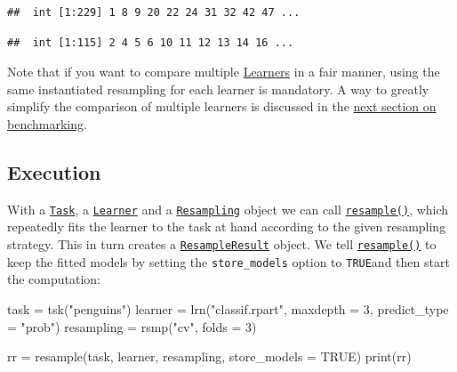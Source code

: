 \documentclass[
]{scrbook}
\newenvironment{Shaded}{\begin{snugshade}}{\end{snugshade}}
\newcommand{\AttributeTok}[1]{\textcolor[rgb]{0.77,0.63,0.00}{#1}}
\newcommand{\ConstantTok}[1]{\textcolor[rgb]{0.00,0.00,0.00}{#1}}
\newcommand{\DecValTok}[1]{\textcolor[rgb]{0.00,0.00,0.81}{#1}}
\newcommand{\FunctionTok}[1]{\textcolor[rgb]{0.00,0.00,0.00}{#1}}
\newcommand{\NormalTok}[1]{#1}
\newcommand{\OtherTok}[1]{\textcolor[rgb]{0.56,0.35,0.01}{#1}}
\newcommand{\SpecialCharTok}[1]{\textcolor[rgb]{0.00,0.00,0.00}{#1}}
\newcommand{\StringTok}[1]{\textcolor[rgb]{0.31,0.60,0.02}{#1}}
\renewenvironment{Shaded} {\begin{snugshade}\small} {\end{snugshade}}
\begin{document}
\begin{verbatim}
##  int [1:229] 1 8 9 20 22 24 31 32 42 47 ...
\end{verbatim}

\begin{Shaded}
\end{Shaded}

\begin{verbatim}
##  int [1:115] 2 4 5 6 10 11 12 13 14 16 ...
\end{verbatim}

Note that if you want to compare multiple \protect\hyperlink{learners}{Learners} in a fair manner, using the same instantiated resampling for each learner is mandatory.
A way to greatly simplify the comparison of multiple learners is discussed in the \protect\hyperlink{benchmarking}{next section on benchmarking}.

\hypertarget{resampling-exec}{%
\subsection{Execution}\label{resampling-exec}}

With a \href{https://mlr3.mlr-org.com/reference/Task.html}{\texttt{Task}}, a \href{https://mlr3.mlr-org.com/reference/Learner.html}{\texttt{Learner}} and a \href{https://mlr3.mlr-org.com/reference/Resampling.html}{\texttt{Resampling}} object we can call \href{https://mlr3.mlr-org.com/reference/resample.html}{\texttt{resample()}}, which repeatedly fits the learner to the task at hand according to the given resampling strategy.
This in turn creates a \href{https://mlr3.mlr-org.com/reference/ResampleResult.html}{\texttt{ResampleResult}} object.
We tell \href{https://mlr3.mlr-org.com/reference/resample.html}{\texttt{resample()}} to keep the fitted models by setting the \texttt{store\_models} option to \texttt{TRUE}and then start the computation:

\begin{Shaded}
\begin{Highlighting}[]
\NormalTok{task }\OtherTok{=} \FunctionTok{tsk}\NormalTok{(}\StringTok{"penguins"}\NormalTok{)}
\NormalTok{learner }\OtherTok{=} \FunctionTok{lrn}\NormalTok{(}\StringTok{"classif.rpart"}\NormalTok{, }\AttributeTok{maxdepth =} \DecValTok{3}\NormalTok{, }\AttributeTok{predict\_type =} \StringTok{"prob"}\NormalTok{)}
\NormalTok{resampling }\OtherTok{=} \FunctionTok{rsmp}\NormalTok{(}\StringTok{"cv"}\NormalTok{, }\AttributeTok{folds =} \DecValTok{3}\NormalTok{)}

\NormalTok{rr }\OtherTok{=} \FunctionTok{resample}\NormalTok{(task, learner, resampling, }\AttributeTok{store\_models =} \ConstantTok{TRUE}\NormalTok{)}
\FunctionTok{print}\NormalTok{(rr)}
\end{Highlighting}
\end{Shaded}
\end{document}
